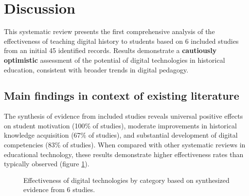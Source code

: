 \documentclass[
hf,
]{ceurart}
\begin{document}
\section{Discussion}

This systematic review presents the first comprehensive analysis of the effectiveness of teaching digital history to students based on 6 included studies from an initial 45 identified records. Results demonstrate a \textbf{cautiously optimistic} assessment of the potential of digital technologies in historical education, consistent with broader trends in digital pedagogy.

\subsection{Main findings in context of existing literature}

The synthesis of evidence from included studies reveals universal positive effects on student motivation (100\% of studies), moderate improvements in historical knowledge acquisition (67\% of studies), and substantial development of digital competencies (83\% of studies). When compared with other systematic reviews in educational technology, these results demonstrate higher effectiveness rates than typically observed (figure \ref{fig:effectiveness_histogram}).

\begin{figure}[h!]
\centering
{}
\caption{Effectiveness of digital technologies by category based on synthesized evidence from 6 studies.}
\label{fig:effectiveness_histogram}
\end{figure}


\end{document}

